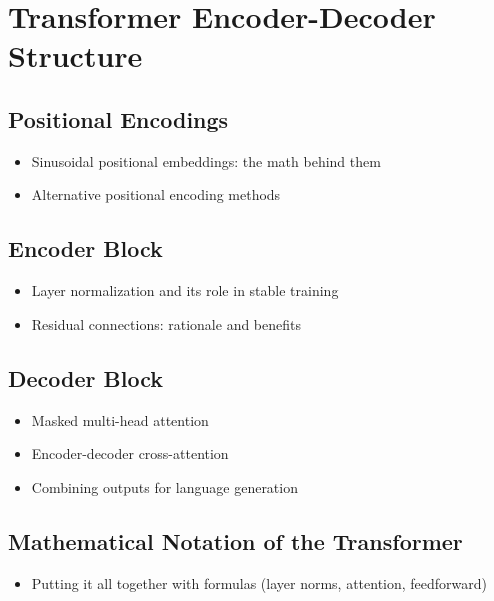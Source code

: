 \documentclass[12pt]{book}
\begin{document}
\chapter{Transformer Encoder-Decoder Structure}
\section{Positional Encodings}
\begin{itemize}
    \item Sinusoidal positional embeddings: the math behind them
    \item Alternative positional encoding methods
\end{itemize}

\section{Encoder Block}
\begin{itemize}
    \item Layer normalization and its role in stable training
    \item Residual connections: rationale and benefits
\end{itemize}

\section{Decoder Block}
\begin{itemize}
    \item Masked multi-head attention
    \item Encoder-decoder cross-attention
    \item Combining outputs for language generation
\end{itemize}

\section{Mathematical Notation of the Transformer}
\begin{itemize}
    \item Putting it all together with formulas (layer norms, attention, feedforward)
\end{itemize}
\end{document}
